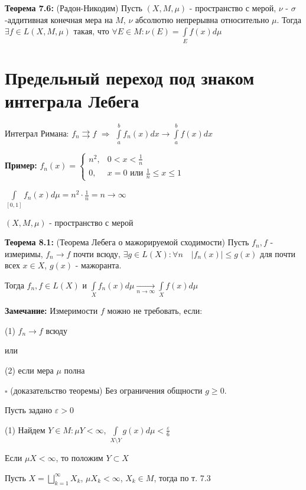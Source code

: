 \documentclass[a4paper]{report}
\begin{document}
\noindent\textbf{Теорема 7.6:} (Радон-Никодим) Пусть $(X,M,\mu)$ - пространство с мерой, $\nu$ - $\sigma$-аддитивная конечная мера на $M$, $\nu$ абсолютно непрерывна относительно $\mu$. Тогда $\exists f\in L(X,M,\mu)$ такая, что $\forall E\in M\colon\nu(E)=\displaystyle\int\limits_E f(x)d\mu$






\chapter{Предельный переход под знаком интеграла Лебега}

Интеграл Римана: $f_n\rightrightarrows f$ $\Rightarrow$ $\displaystyle\int\limits_a^b f_n(x)dx\to\displaystyle\int\limits_a^b f(x)dx$

\noindent\textbf{Пример:} $f_n(x)=\begin{cases}n^2,&0<x<\frac1n\\0,&x=0\text{ или }\frac1n\le x\le 1\end{cases}$

$\displaystyle\int\limits_{[0,1]}f_n(x)d\mu=n^2\cdot\frac1n=n\to\infty$
\bigskip

$(X,M,\mu)$ - пространство с мерой

\noindent\textbf{Теорема 8.1:} (Теорема Лебега о мажорируемой сходимости) Пусть $f_n,f$ - измеримы, $f_n\to f$ почти всюду, $\exists g\in L(X)\colon\forall n\quad
|f_n(x)|\le g(x)$ для почти всех $x\in X$, $g(x)$ - мажоранта.

Тогда $f_n,f\in L(X)$ и $\displaystyle\int\limits_X f_n(x)d\mu\xrightarrow[n\to\infty]{}\displaystyle\int\limits_X f(x)d\mu$
\bigskip

\noindent\textbf{Замечание:} Измеримости $f$ можно не требовать, если:

(1) $f_n\to f$ всюду

или

(2) если мера $\mu$ полна

\noindent $\square$ (доказательство теоремы) Без ограничения общности $g\ge0$.

Пусть задано $\varepsilon>0$

(1) Найдем $Y\in M\colon\mu Y<\infty$, $\displaystyle\int\limits_{X\setminus Y} g(x)d\mu<\frac\varepsilon6$

Если $\mu X<\infty$, то положим $Y\subset X$

Пусть $X=\bigsqcup\limits_{k=1}^\infty X_k$, $\mu X_k<\infty$, $X_k\in M$, тогда по т. 7.3
\end{document}
